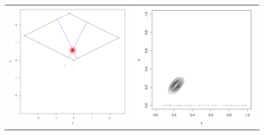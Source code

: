 \documentclass[10pt]{article}
\begin{document}
\begin{figure}
  \centering
  \begin{tabular}{cc}
    \begin{minipage}{0.5\textwidth}
      \centering
      \includegraphics[width=1\linewidth]{small-time-solution.png}
    \end{minipage}
    & \begin{minipage}{0.5\textwidth}
      \centering
      \includegraphics[width=1\linewidth]{small-time-solution-contour.png}

\end{minipage}
\end{tabular}
\end{figure}
\end{document}
